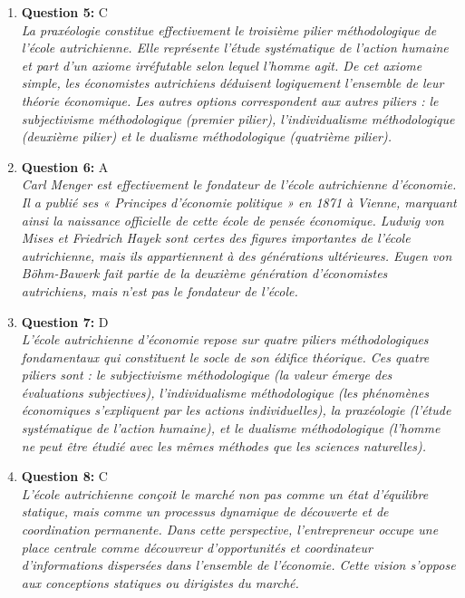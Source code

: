 \documentclass[12pt,a4paper]{article}
\begin{document}
\begin{enumerate}
\item \textbf{Question 5:} C
\\ \textit{La praxéologie constitue effectivement le troisième pilier méthodologique de l'école autrichienne. Elle représente l'étude systématique de l'action humaine et part d'un axiome irréfutable selon lequel l'homme agit. De cet axiome simple, les économistes autrichiens déduisent logiquement l'ensemble de leur théorie économique. Les autres options correspondent aux autres piliers : le subjectivisme méthodologique (premier pilier), l'individualisme méthodologique (deuxième pilier) et le dualisme méthodologique (quatrième pilier).}

\item \textbf{Question 6:} A
\\ \textit{Carl Menger est effectivement le fondateur de l'école autrichienne d'économie. Il a publié ses « Principes d'économie politique » en 1871 à Vienne, marquant ainsi la naissance officielle de cette école de pensée économique. Ludwig von Mises et Friedrich Hayek sont certes des figures importantes de l'école autrichienne, mais ils appartiennent à des générations ultérieures. Eugen von Böhm-Bawerk fait partie de la deuxième génération d'économistes autrichiens, mais n'est pas le fondateur de l'école.}

\item \textbf{Question 7:} D
\\ \textit{L'école autrichienne d'économie repose sur quatre piliers méthodologiques fondamentaux qui constituent le socle de son édifice théorique. Ces quatre piliers sont : le subjectivisme méthodologique (la valeur émerge des évaluations subjectives), l'individualisme méthodologique (les phénomènes économiques s'expliquent par les actions individuelles), la praxéologie (l'étude systématique de l'action humaine), et le dualisme méthodologique (l'homme ne peut être étudié avec les mêmes méthodes que les sciences naturelles).}

\item \textbf{Question 8:} C
\\ \textit{L'école autrichienne conçoit le marché non pas comme un état d'équilibre statique, mais comme un processus dynamique de découverte et de coordination permanente. Dans cette perspective, l'entrepreneur occupe une place centrale comme découvreur d'opportunités et coordinateur d'informations dispersées dans l'ensemble de l'économie. Cette vision s'oppose aux conceptions statiques ou dirigistes du marché.}


\end{enumerate}
\end{document}
